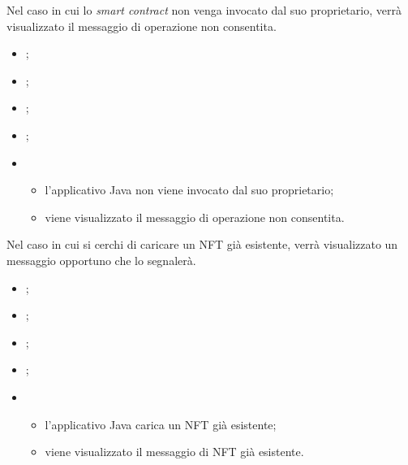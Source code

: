 \label{UC:extension.operation-not-allowed}

Nel caso in cui lo \textit{smart contract} non venga invocato dal suo proprietario, verrà visualizzato il messaggio di operazione non consentita.

\begin{itemize}
  \item {};
  \item {};
  \item {};
  \item {};
  
  \item \UCMain
  \begin{itemize}
    \item l'applicativo Java non viene invocato dal suo proprietario;
    \item viene visualizzato il messaggio di operazione non consentita. 
  \end{itemize}
\end{itemize}

\label{UC:extension.nft-exists-yet}

Nel caso in cui si cerchi di caricare un NFT già esistente, verrà visualizzato un messaggio opportuno che lo segnalerà.

\begin{itemize}
  \item {};
  \item {};
  \item {};
  \item {};
  
  \item \UCMain
  \begin{itemize}
    \item l'applicativo Java carica un NFT già esistente;
    \item viene visualizzato il messaggio di NFT già esistente.
  \end{itemize}
\end{itemize}

\label{UC:extension.nft-not-exists}

